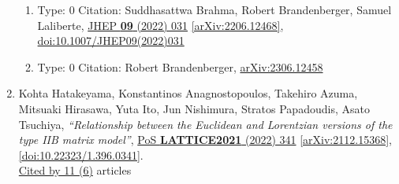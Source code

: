 \documentclass[a4paper,10pt]{article}
\begin{document}
\begin{enumerate}
\begin{enumerate}
  \item Type: 0 Citation: Suddhasattwa Brahma, Robert Brandenberger, Samuel Laliberte, \href{https://www.doi.org/10.1007/JHEP09(2022)031}{JHEP {\bf 09} (2022) 031}  \href{https://arxiv.org/abs/2206.12468}{[arXiv:2206.12468]},\\\href{https://www.doi.org/10.1007/JHEP09(2022)031}{doi:10.1007/JHEP09(2022)031}
  \item Type: 0 Citation: Robert Brandenberger, \href{https://arxiv.org/abs/2306.12458}{arXiv:2306.12458}
\end{enumerate}
\item Kohta Hatakeyama, Konstantinos Anagnostopoulos, Takehiro Azuma, Mitsuaki Hirasawa, Yuta Ito, Jun Nishimura, Stratos Papadoudis, Asato Tsuchiya, {\it ``Relationship between the Euclidean and Lorentzian versions of the type IIB matrix model''}, \href{https://www.doi.org/10.22323/1.396.0341}{PoS {\bf LATTICE2021} (2022) 341} \href{https://arxiv.org/abs/2112.15368}{[arXiv:2112.15368]}, \href{https://www.doi.org/10.22323/1.396.0341}{[doi:10.22323/1.396.0341]}.
\\\href{https://inspirehep.net/literature/?q=refersto%3Arecid%3A1998854}{Cited by 11 (6)} articles


\end{enumerate}
\end{document}
